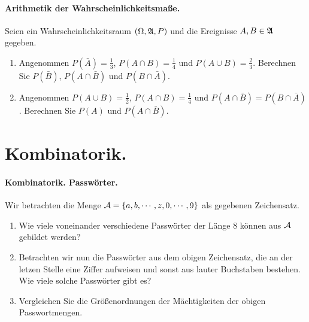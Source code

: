 \paragraph{Arithmetik der Wahrscheinlichkeitsmaße.} Seien ein
Wahrscheinlichkeitsraum $\left( \Omega, \mathfrak A, P \right)$ und die Ereignisse $A,
B \in \mathfrak A$ gegeben. 
\begin{enumerate}
    \item Angenommen $P(\bar A)=\frac{1}{3}$, $P(A\cap B)=\frac{1}{4}$ und
        $P(A \cup B)=\frac{2}{3}$. Berechnen Sie $P(\bar B)$, $P(A \cap \bar B)$
        und $P( B \cap \bar A )$.
        
    \item Angenommen $P(A \cup B) = \frac{1}{2}$, $P(A \cap B) = \frac{1}{4}$
        und $P(A \cap \bar B) = P(B \cap \bar A)$. Berechnen Sie $P(A)$ und
        $P(A \cap \bar B)$. 
\end{enumerate}



\section{Kombinatorik.}


\paragraph{Kombinatorik. Passwörter.} Wir betrachten die Menge
$\mathcal A = \left\{ a, b, \cdots, z, 0, \cdots, 9 \right\}$ als gegebenen Zeichensatz.
\begin{enumerate}
    \item Wie viele voneinander verschiedene Passwörter der Länge 8 können
        aus $\mathcal A$ gebildet werden?
    \item Betrachten wir nun die Passwörter aus dem obigen Zeichensatz, die an der
        letzen Stelle eine Ziffer aufweisen und sonst aus lauter Buchstaben bestehen.
        Wie viele solche Passwörter gibt es?
    \item Vergleichen Sie die Größenordnungen der Mächtigkeiten der obigen
        Passwortmengen. 
\end{enumerate}

